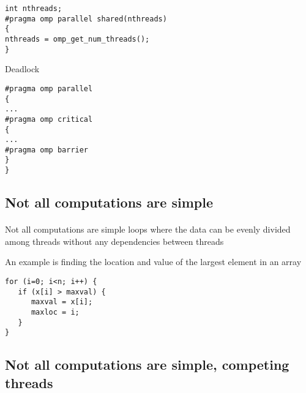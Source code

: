\documentclass[%
oneside,                 %
final,                   %
10pt]{article}
\begin{document}
\begin{verbatim}
int nthreads;
#pragma omp parallel shared(nthreads)
{
nthreads = omp_get_num_threads();
}

\end{verbatim}

Deadlock










\begin{verbatim}
#pragma omp parallel
{
...
#pragma omp critical
{
...
#pragma omp barrier
}
}

\end{verbatim}



\subsection*{Not all computations are simple}

\paragraph{}
Not all computations are simple loops where the data can be evenly 
divided among threads without any dependencies between threads

An example is finding the location and value of the largest element in an array







\begin{verbatim}
for (i=0; i<n; i++) { 
   if (x[i] > maxval) {
      maxval = x[i];
      maxloc = i; 
   }
}

\end{verbatim}



\subsection*{Not all computations are simple, competing threads}
\end{document}

